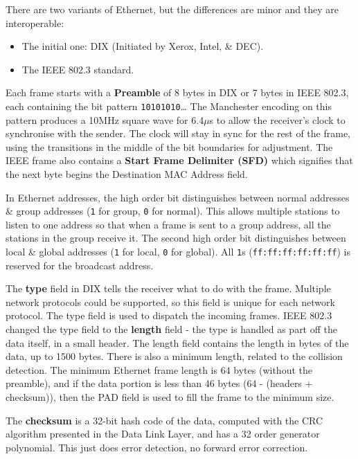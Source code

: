 \documentclass[11pt]{article}
\begin{document}
There are two variants of Ethernet, but the differences are minor and they are interoperable:
\begin{itemize}
    \item The initial one: DIX (Initiated by Xerox, Intel, \& DEC). 
    \item The IEEE 802.3 standard.
\end{itemize}

Each frame starts with a \textbf{Preamble} of 8 bytes in DIX or 7 bytes in IEEE 802.3, each containing the bit pattern
\verb|10101010|\dots
The Manchester encoding on this pattern produces a 10MHz square wave for 6.4$\mu$s to allow the receiver's clock 
to synchronise with the sender.
The clock will stay in sync for the rest of the frame, using the transitions in the middle of the bit boundaries 
for adjustment.
The IEEE frame also contains a \textbf{Start Frame Delimiter (SFD)} which signifies that the next byte begins the 
Destination MAC Address field.

In Ethernet addresses, the high order bit distinguishes between normal addresses \& group addresses (\verb|1| for 
group, \verb|0| for normal). 
This allows multiple stations to listen to one address so that when a frame is sent to a group address, all the 
stations in the group receive it.
The second high order bit distinguishes between local \& global addresses (\verb|1| for local, \verb|0| for global).  
All \verb|1|s (\verb|ff:ff:ff:ff:ff:ff|) is reserved for the broadcast address.

The \textbf{type} field in DIX tells the receiver what to do with the frame. 
Multiple network protocols could be supported, so this field is unique for each network protocol. 
The type field is used to dispatch the incoming frames. 
IEEE 802.3 changed the type field to the \textbf{length} field - the type is handled as part off the data itself, 
in a small header.
The length field contains the length in bytes of the data, up to 1500 bytes.
There is also a minimum length, related to the collision detection.
The minimum Ethernet frame length is 64 bytes (without the preamble), and if the data portion is less than 46 bytes
(64 - (headers + checksum)), then the PAD field is used to fill the frame to the minimum size.

The \textbf{checksum} is a 32-bit hash code of the data, computed with the CRC algorithm presented in the Data 
Link Layer, and has a 32 order generator polynomial.
This just does error detection, no forward error correction.
\end{document}
